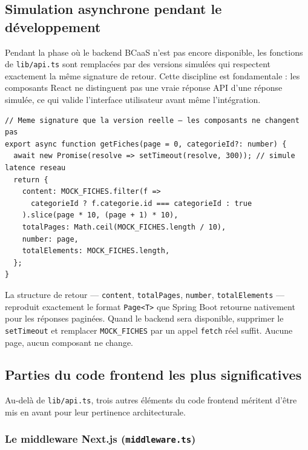 \documentclass[12pt,a4paper]{report}
\begin{document}
\subsection*{Simulation asynchrone pendant le développement}

Pendant la phase où le backend BCaaS n'est pas encore disponible, les
fonctions de \texttt{lib/api.ts} sont remplacées par des versions simulées
qui respectent exactement la même signature de retour. Cette discipline est
fondamentale : les composants React ne distinguent pas une vraie réponse API
d'une réponse simulée, ce qui valide l'interface utilisateur avant même
l'intégration.

\begin{lstlisting}[caption={\texttt{lib/api.ts} --- version simulée de \texttt{getFiches()}}]
// Meme signature que la version reelle — les composants ne changent pas
export async function getFiches(page = 0, categorieId?: number) {
  await new Promise(resolve => setTimeout(resolve, 300)); // simule latence reseau
  return {
    content: MOCK_FICHES.filter(f =>
      categorieId ? f.categorie.id === categorieId : true
    ).slice(page * 10, (page + 1) * 10),
    totalPages: Math.ceil(MOCK_FICHES.length / 10),
    number: page,
    totalElements: MOCK_FICHES.length,
  };
}
\end{lstlisting}

La structure de retour --- \texttt{content}, \texttt{totalPages},
\texttt{number}, \texttt{totalElements} --- reproduit exactement le format
\texttt{Page<T>} que Spring Boot retourne nativement pour les réponses
paginées. Quand le backend sera disponible, supprimer le \texttt{setTimeout}
et remplacer \texttt{MOCK\_FICHES} par un appel \texttt{fetch} réel suffit.
Aucune page, aucun composant ne change.

\subsection*{Parties du code frontend les plus significatives}

Au-delà de \texttt{lib/api.ts}, trois autres éléments du code frontend
méritent d'être mis en avant pour leur pertinence architecturale.

\subsubsection*{Le middleware Next.js (\texttt{middleware.ts})}
\end{document}
